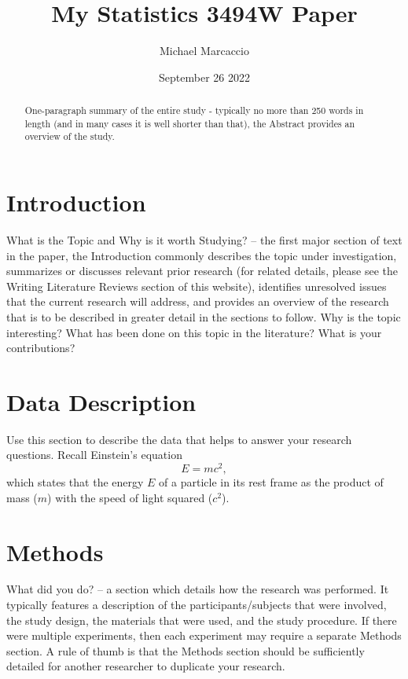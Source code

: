 \documentclass[12pt]{article}
\title{My Statistics 3494W Paper}
\author{Michael  Marcaccio}
\date{September 26 2022}
\begin{document}
\maketitle

\begin{abstract}
  One-paragraph summary of the entire study - typically no more than 250 words in length (and in many cases it is well shorter than that), the Abstract provides an overview of the study.
\end{abstract}

\section*{Introduction}
What is the Topic and Why is it worth Studying? – the first major section of text in the paper, the Introduction commonly describes the topic under investigation, summarizes or discusses relevant prior research (for related details, please see the Writing Literature Reviews section of this website), identifies unresolved issues that the current research will address, and provides an overview of the research that is to be described in greater detail in the sections to follow.
Why is the topic interesting?
What has been done on this topic in the literature?
What is your contributions?
\section*{Data Description}
Use this section to describe the data that helps to answer your research
questions. Recall Einstein's equation
\begin{equation}
  \label{eq:mc2}
  E = m c^2,
\end{equation}
which states that the energy $E$ of a particle in its rest frame as the product
of mass ($m$) with the speed of light squared ($c^2$).

\section*{Methods}
What did you do? – a section which details how the research was performed.  It typically features a description of the participants/subjects that were involved, the study design, the materials that were used, and the study procedure.  If there were multiple experiments, then each experiment may require a separate Methods section.  A rule of thumb is that the Methods section should be sufficiently detailed for another researcher to duplicate your research.
\end{document}
